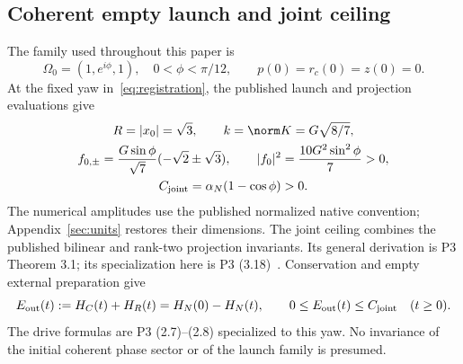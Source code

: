 \subsection{Coherent empty launch and joint ceiling}
The family used throughout this paper is
\begin{equation}\label{eq:launch}%
\Omega_0=(1,e^{i\phi},1),\quad 0<\phi<\pi/12,\qquad
p(0)=r_c(0)=z(0)=0.
\end{equation}
At the fixed yaw in~\eqref{eq:registration}, the published launch and projection evaluations give
\begin{equation}\label{eq:drive0}%
\begin{gathered}
R=|x_0|=\sqrt3,\qquad k=\norm K=G\sqrt{8/7},\\
f_{0,\pm}=\frac{G\sin\phi}{\sqrt7}(-\sqrt2\pm\sqrt3),\qquad
|f_0|^2=\frac{10G^2\sin^2\phi}{7}>0,\\
C_{\rm joint}=\alpha_N(1-\cos\phi)>0.
\end{gathered}
\end{equation}
The numerical amplitudes use the published normalized native convention; Appendix~\ref{sec:units} restores their dimensions. The joint ceiling combines the published bilinear and rank-two projection invariants. Its general derivation is P3 Theorem 3.1; its specialization here is P3 (3.18)~\cite{p3}. Conservation and empty external preparation give
\begin{equation}\label{eq:ceiling}%
E_{\rm out}(t):=H_C(t)+H_R(t)=H_N(0)-H_N(t),
\qquad 0\le E_{\rm out}(t)\le C_{\rm joint}\quad(t\ge0).
\end{equation}
The drive formulas are P3 (2.7)--(2.8) specialized to this yaw. No invariance of the initial coherent phase sector or of the launch family is presumed.
